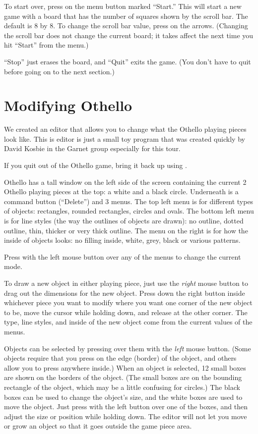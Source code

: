 To start over, press on the menu button marked ``Start.''  This will start
a new game with a board that has the number of squares shown by the scroll
bar.  The default is 8 by 8.  To change the scroll bar value, press on the
arrows.  (Changing the scroll bar does not change the current board; it
takes affect the next time you hit ``Start'' from the menu.)

``Stop'' just erases the board, and ``Quit'' exits the game.  (You don't
have to quit before going on to the next section.)

\chapter{Modifying Othello}

We created an editor that allows you to change what the Othello playing
pieces look like.  This is editor is just a small toy program that was
created quickly by David Kosbie in the Garnet group especially for this tour.

If you quit out of the Othello game, bring it back up using .

Othello has a tall window on the left side of the screen containing
the current 2 Othello playing  pieces at the top: a white
and a black circle.  Underneath is a command button (``Delete'') and 3
menus.  The top left menu is for different types of objects: rectangles,
rounded rectangles, circles and ovals.  The bottom left menu is for line
styles (the way the outlines of objects are drawn): no outline, dotted
outline, thin, thicker or very thick outline.  The menu on the right is for
how the inside of objects looks: no filling inside, white, grey, black or
various patterns.

Press with the left mouse button over any of the menus to change the
current mode.

To draw a new object in either playing
piece, just use the {\it right} mouse button
to drag out the dimensions for the new object.  Press down the right button
inside whichever piece you want to modify where you want one corner of the
new object to be, move the cursor while holding down, and
release at the other corner.  The type, line styles, and
inside of the new object come from the current values of the menus.

Objects can be selected by pressing over them with the {\it left} mouse
button.  (Some objects require that you press on the edge (border) of the
object, and others allow you to press anywhere inside.)
When an object is selected, 12 small boxes are shown on the borders of
the object.  (The small boxes are on the bounding rectangle of the object, which
may be a little confusing for circles.)
The black boxes can be used to change the object's size, and
the white boxes are used to move the object.  Just press with the left
button over one of the boxes, and then adjust the size or position while
holding down.  The editor will not let you move or grow an object so that
it goes outside the game piece area.

